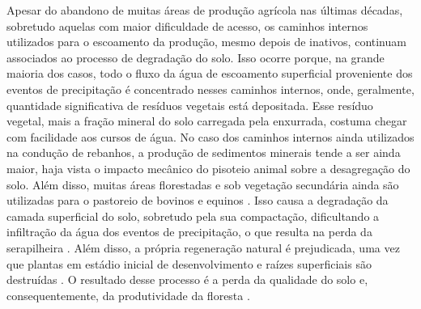 
Apesar do abandono de muitas áreas de produção agrícola nas últimas décadas, sobretudo aquelas com maior 
dificuldade de acesso, os caminhos internos utilizados para o escoamento da produção, mesmo depois de 
inativos, continuam associados ao processo de degradação do solo. Isso ocorre porque, na grande maioria dos 
casos, todo o fluxo da água de escoamento superficial proveniente dos eventos de precipitação é concentrado 
nesses caminhos internos, onde, geralmente, quantidade significativa de resíduos vegetais está depositada. 
Esse resíduo vegetal, mais a fração mineral do solo carregada pela enxurrada, costuma chegar com facilidade 
aos cursos de água. No caso dos caminhos internos ainda utilizados na condução de rebanhos, a produção de 
sedimentos minerais tende a ser ainda maior, haja vista o impacto mecânico do pisoteio animal sobre a 
desagregação do solo. Além disso, muitas áreas florestadas e sob vegetação secundária ainda são utilizadas 
para o pastoreio de bovinos e equinos \cite{SamuelRosaEtAl2011a}. Isso causa a degradação da camada 
superficial 
do solo, sobretudo pela sua compactação, dificultando a infiltração da água dos eventos de precipitação, o que 
resulta na perda da serapilheira \cite{ScheneiderEtAl1978}. Além disso, a própria regeneração natural é 
prejudicada, uma vez que plantas em estádio inicial de desenvolvimento e raízes superficiais são destruídas 
\cite{ScheneiderEtAl1978, HackEtAl2005}. O resultado desse processo é a perda da qualidade do solo e, 
consequentemente, da produtividade da floresta \cite{KonigEtAl2002}.


